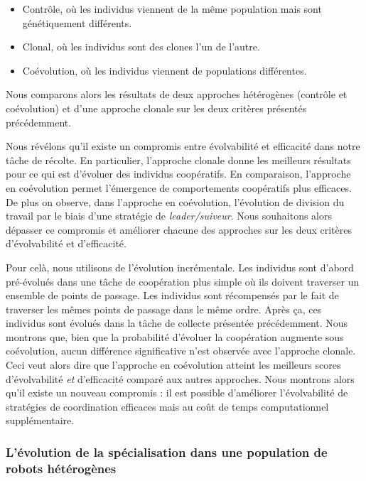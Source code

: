 			\begin{itemize}
			  \item{Contrôle, où les individus viennent de la même population mais sont génétiquement différents.}
			  \item{Clonal, où les individus sont des clones l'un de l'autre.}
			  \item{Coévolution, où les individus viennent de populations différentes.}
			\end{itemize}

			Nous comparons alors les résultats de deux approches hétérogènes (contrôle et coévolution) et d'une approche clonale sur les deux critères présentés précédemment.

			Nous révélons qu'il existe un compromis entre évolvabilité et efficacité dans notre tâche de récolte. En particulier, l'approche clonale donne les meilleurs résultats pour ce qui est d'évoluer des individus coopératifs. En comparaison, l'approche en coévolution permet l'émergence de comportements coopératifs plus efficaces. De plus on observe, dans l'approche en coévolution, l'évolution de division du travail par le biais d'une stratégie de \emph{leader/suiveur}. Nous souhaitons alors dépasser ce compromis et améliorer chacune des approches sur les deux critères d'évolvabilité et d'efficacité.

			Pour celà, nous utilisons de l'évolution incrémentale. Les individus sont d'abord pré-évolués dans une tâche de coopération plus simple où ils doivent traverser un ensemble de points de passage. Les individus sont récompensés par le fait de traverser les mêmes points de passage dans le même ordre. Après ça, ces individus sont évolués dans la tâche de collecte présentée précédemment. Nous montrons que, bien que la probabilité d'évoluer la coopération augmente sous coévolution, aucun différence significative n'est observée avec l'approche clonale. Ceci veut alors dire que l'approche en coévolution atteint les meilleurs scores d'évolvabilité \emph{et} d'efficacité comparé aux autres approches. Nous montrons alors qu'il existe un nouveau compromis : il est possible d'améliorer l'évolvabilité de stratégies de coordination efficaces mais au coût de temps computationnel supplémentaire.


		\subsubsection{L'évolution de la spécialisation dans une population de robots hétérogènes}

